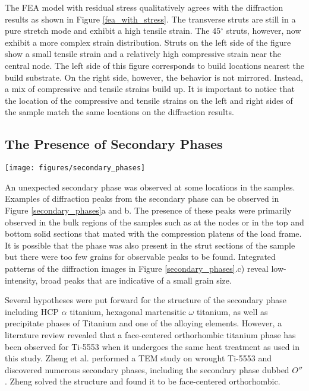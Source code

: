 The FEA model with residual stress qualitatively agrees with the diffraction results as shown in Figure \ref{fea_with_stress}. The transverse struts are still in a pure stretch mode and exhibit a high tensile strain. The 45$^\circ$ struts, however, now exhibit a more complex strain distribution. Struts on the left side of the figure show a small tensile strain and a relatively high compressive strain near the central node. The left side of this figure corresponds to build locations nearest the build substrate. On the right side, however, the behavior is not mirrored. Instead, a mix of compressive and tensile strains build up. It is important to notice that the location of the compressive and tensile strains on the left and right sides of the sample match the same locations on the diffraction results.

\subsection{The Presence of Secondary Phases}
\begin{figure*}
	\texttt{[image: figures/secondary\_phases]}
	\caption{A secondary phase was observed present in the samples. Diffraction spots indicative of the secondary phase can be observed in a) and b). A logarithmic intensity plot of an integrated diffraction pattern demonstrates the presence of unexpected peaks, highlighted with red arrows in c). The same plot can be seen in linear intensity in d).}
	\label{secondary_phases}
\end{figure*}

An unexpected secondary phase was observed at some locations in the samples. Examples of diffraction peaks from the secondary phase can be observed in Figure \ref{secondary_phases}a and b. The presence of these peaks were primarily observed in the bulk regions of the samples such as at the nodes or in the top and bottom solid sections that mated with the compression platens of the load frame. It is possible that the phase was also present in the strut sections of the sample but there were too few grains for observable peaks to be found. Integrated patterns of the diffraction images in Figure \ref{secondary_phases}.c) reveal low-intensity, broad peaks that are indicative of a small grain size.

Several hypotheses were put forward for the structure of the secondary phase including HCP $\alpha$ titanium, hexagonal martensitic $\omega$ titanium, as well as precipitate phases of Titanium and one of the alloying elements. However, a literature review revealed that a face-centered orthorhombic titanium phase has been observed for Ti-5553 when it undergoes the same heat treatment as used in this study. Zheng et al. performed a TEM study on wrought Ti-5553 and discovered numerous secondary phases, including the secondary phase dubbed $O''$ \cite{Zheng2016}. Zheng solved the structure and found it to be face-centered orthorhombic.

